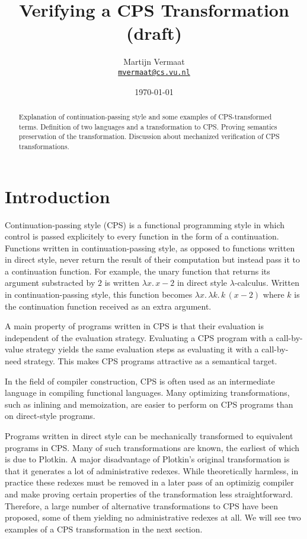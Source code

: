 \documentclass[a4paper,11pt,draft]{article}
\title{\sffamily Verifying a CPS Transformation (draft)}
\author{
  Martijn Vermaat\\[0.3em]
  \href{mailto:mvermaat@cs.vu.nl}{\texttt{mvermaat@cs.vu.nl}}
}
\date{\today}
\begin{document}
\maketitle


\begin{abstract}
  Explanation of continuation-passing style and some examples of CPS-transformed
  terms. Definition of two languages and a transformation to CPS. Proving
  semantics preservation of the transformation. Discussion about mechanized
  verification of CPS transformations.
\end{abstract}


\section{Introduction}\label{sec:introduction}


Continuation-passing style (CPS) is a functional programming style in which control is
passed explicitely to every function in the form of a continuation. Functions
written in continuation-passing style, as opposed to functions written in direct
style, never return the result of their computation but instead pass it to a
continuation function. For example, the unary function that returns its argument
substracted by $2$ is written $\lambda x. \, x - 2$ in direct style
$\lambda$-calculus. Written in continuation-passing style, this function becomes
$\lambda x. \, \lambda k. \, k \, (x - 2)$ where $k$ is the continuation function
received as an extra argument.

A main property of programs written in CPS is that their evaluation is independent
of the evaluation strategy. Evaluating a CPS program with a call-by-value strategy
yields the same evaluation steps as evaluating it with a call-by-need strategy. This
makes CPS programs attractive as a semantical target.

In the field of compiler construction, CPS is often used as an intermediate language
in compiling functional languages. Many optimizing transformations, such as inlining
and memoization, are easier to perform on CPS programs than on direct-style programs.

Programs written in direct style can be mechanically transformed to equivalent
programs in CPS. Many of such transformations are known, the earliest of which is
due to Plotkin. A major disadvantage of Plotkin's original transformation is
that it generates a lot of administrative redexes. While theoretically harmless, in
practice these redexes must be removed in a later pass of an optimizig compiler and
make proving certain properties of the transformation less straightforward. Therefore,
a large number of alternative transformations to CPS have been proposed, some of them
yielding no administrative redexes at all. We will see two examples of a CPS
transformation in the next section.
\end{document}
